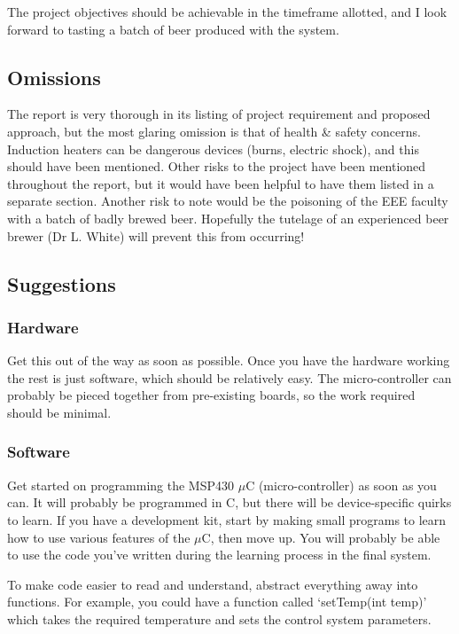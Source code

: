 \documentclass[a4paper,12pt]{article}
\begin{document}
The project objectives should be achievable in the timeframe allotted, and I look forward to tasting a batch of beer produced with the system.

\subsection{Omissions}

The report is very thorough in its listing of project requirement and proposed approach, but the most glaring omission is that of health \& safety concerns. Induction heaters can be dangerous devices (burns, electric shock), and this should have been mentioned. Other risks to the project have been mentioned throughout the report, but it would have been helpful to have them listed in a separate section. Another risk to note would be the poisoning of the EEE faculty with a batch of badly brewed beer. Hopefully the tutelage of an experienced beer brewer (Dr L. White) will prevent this from occurring!

\subsection{Suggestions}
\subsubsection{Hardware}
Get this out of the way as soon as possible. Once you have the hardware working the rest is just software, which should be relatively easy. The micro-controller can probably be pieced together from pre-existing boards, so the work required should be minimal.

\subsubsection{Software}
Get started on programming the MSP430 $\mu$C (micro-controller) as soon as you can. It will probably be programmed in C, but there will be device-specific quirks to learn. If you have a development kit, start by making small programs to learn how to use various features of the $\mu$C, then move up. You will probably be able to use the code you've written during the learning process in the final system.

To make code easier to read and understand, abstract everything away into functions. For example, you could have a function called `setTemp(int temp)' which takes the required temperature and sets the control system parameters. 
\end{document}
